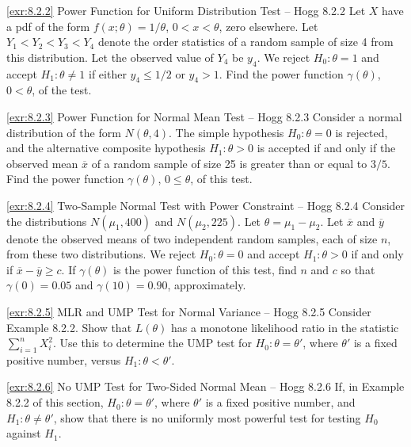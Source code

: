 \begin{exercise}{\ref{exr:8.2.2} Power Function for Uniform Distribution Test -- Hogg 8.2.2}\label{exr:8.2.2}
Let $X$ have a pdf of the form $f(x; \theta) = 1/\theta$, $0 < x < \theta$, zero elsewhere. Let $Y_1 < Y_2 < Y_3 < Y_4$ denote the order statistics of a random sample of size 4 from this distribution. Let the observed value of $Y_4$ be $y_4$. We reject $H_0: \theta = 1$ and accept $H_1: \theta \neq 1$ if either $y_4 \leq 1/2$ or $y_4 > 1$. Find the power function $\gamma(\theta)$, $0 < \theta$, of the test.
\end{exercise}

\begin{exercise}{\ref{exr:8.2.3} Power Function for Normal Mean Test -- Hogg 8.2.3}\label{exr:8.2.3}
Consider a normal distribution of the form $N(\theta, 4)$. The simple hypothesis $H_0: \theta = 0$ is rejected, and the alternative composite hypothesis $H_1: \theta > 0$ is accepted if and only if the observed mean $\overline{x}$ of a random sample of size 25 is greater than or equal to $3/5$. Find the power function $\gamma(\theta)$, $0 \leq \theta$, of this test.
\end{exercise}

\begin{exercise}{\ref{exr:8.2.4} Two-Sample Normal Test with Power Constraint -- Hogg 8.2.4}\label{exr:8.2.4}
Consider the distributions $N(\mu_1, 400)$ and $N(\mu_2, 225)$. Let $\theta = \mu_1 - \mu_2$. Let $\overline{x}$ and $\overline{y}$ denote the observed means of two independent random samples, each of size $n$, from these two distributions. We reject $H_0: \theta = 0$ and accept $H_1: \theta > 0$ if and only if $\overline{x} - \overline{y} \geq c$. If $\gamma(\theta)$ is the power function of this test, find $n$ and $c$ so that $\gamma(0) = 0.05$ and $\gamma(10) = 0.90$, approximately.
\end{exercise}

\begin{exercise}{\ref{exr:8.2.5} MLR and UMP Test for Normal Variance -- Hogg 8.2.5}\label{exr:8.2.5}
Consider Example 8.2.2. Show that $L(\theta)$ has a monotone likelihood ratio in the statistic $\sum_{i=1}^n X_i^2$. Use this to determine the UMP test for $H_0: \theta = \theta'$, where $\theta'$ is a fixed positive number, versus $H_1: \theta < \theta'$.
\end{exercise}

\begin{exercise}{\ref{exr:8.2.6} No UMP Test for Two-Sided Normal Mean -- Hogg 8.2.6}\label{exr:8.2.6}
If, in Example 8.2.2 of this section, $H_0: \theta = \theta'$, where $\theta'$ is a fixed positive number, and $H_1: \theta \neq \theta'$, show that there is no uniformly most powerful test for testing $H_0$ against $H_1$.
\end{exercise}

